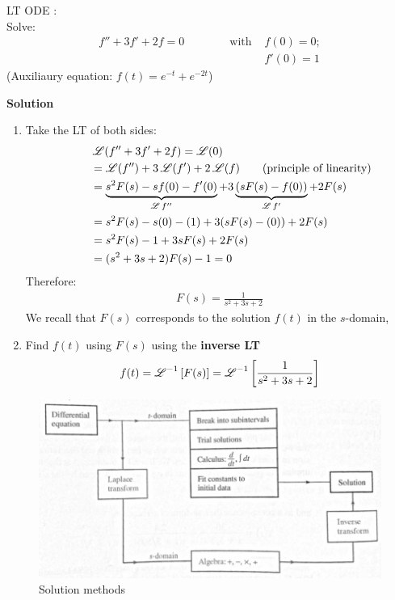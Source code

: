 \begin{exmp}{LT ODE :}\\
Solve:
\begin{align*}
f''+3f'+2f=0 \qquad \qquad \text{with } &f(0)=0; \\
&f'(0)=1
\end{align*}
(Auxiliaury equation: $f(t)=e^{-t}+e^{-2t}$)

\textbf{Solution}\\
\begin{enumerate}
\item Take the LT of both sides:
\begin{align*}
\qquad & \operatorname{\mathscr{L}}(f''+3f'+2f)=\operatorname{\mathscr{L}}(0)\\
&=\operatorname{\mathscr{L}}(f'')+3\operatorname{\mathscr{L}}(f')+2\operatorname{\mathscr{L}}(f) \qquad \text{(principle of linearity)}\\
&=\underbrace{s^2 F(s) - sf(0)-f'(0)}_{\operatorname{\mathscr{L}}{f''}} +3\underbrace{(sF(s) - f(0))}_{\operatorname{\mathscr{L}}{f'}} +2F(s)\\
&=s^2 F(s) - s(0)-(1) +3(sF(s) - (0)) +2F(s)\\
&=s^2 F(s) -1 +3sF(s) +2F(s)\\
&=(s^2 +3s+2) F(s) -1 =0\\
\end{align*}
Therefore:
\begin{align*}
F(s)=\frac{1}{s^2 +3s+2}
\end{align*}
We recall that $F(s)$ corresponds to the solution $f(t)$ in the $s$-domain,

\item Find $f(t)$ using $F(s)$ using the \textbf{inverse LT}
\begin{align*}
f(t)=\operatorname{\mathscr{L}}^{-1}\left[F(s)\right]=\operatorname{\mathscr{L}}^{-1}\left[\frac{1}{s^2 +3s+2}\right]
\end{align*}
\end{enumerate}
\end{exmp}


\begin{figure}[h!]
\includegraphics[width=\textwidth]{figs/LaplaceExample.png} 
\caption{Solution methods}
\end{figure}



